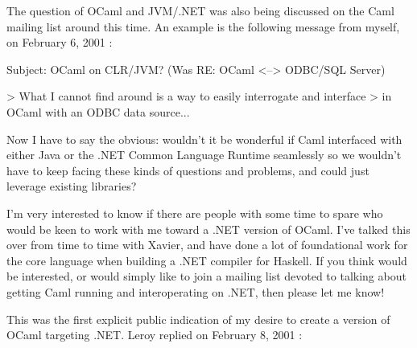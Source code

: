 \documentclass[acmsmall,screen]{acmart}
\begin{document}
The question of OCaml and JVM/.NET was also being discussed on the Caml mailing list around this time.  An example is the following message from
myself, on February 6, 2001 \citep{RefCamlArchive1}:
\begin{verbquote}
Subject: OCaml on CLR/JVM? (Was RE: OCaml <--> ODBC/SQL Server)

> What I cannot find around is a way to easily interrogate and interface 
> in OCaml with an ODBC data source...

Now I have to say the obvious: wouldn't it be wonderful if Caml interfaced with either Java or the .NET Common Language Runtime seamlessly so we wouldn't have to keep facing these kinds of questions and problems, and could just leverage existing libraries?   

I'm very interested to know if there are people with some time to spare who would be keen to work with me toward a .NET version of OCaml.  I've talked this over from time to time with Xavier, and have done a lot of foundational work for the core language when building a .NET compiler for Haskell.  If you think would be interested, or would simply like to join a mailing list devoted to talking about getting Caml running and interoperating on .NET, then please let me know!
\end{verbquote}
This was the first explicit public indication of my desire to create a version of OCaml targeting .NET. Leroy replied on February 8, 2001 \citep{RefCamlArchive2}:
\end{document}
